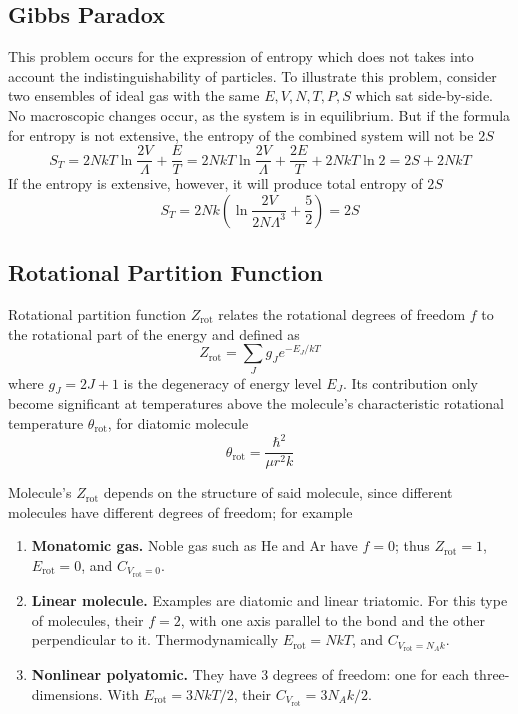 \documentclass[../../../Main.tex]{subfiles}
\begin{document}
\subsection*{Gibbs Paradox}

This problem occurs for the expression of entropy which does not takes into account the indistinguishability of particles. To illustrate this problem, consider two ensembles of ideal gas with the same $E,V,N,T,P,S$ which sat side-by-side.  No macroscopic changes occur, as the system is in equilibrium. But if the formula for entropy is not extensive, the entropy of the combined system will not be $2S$
\begin{equation*}
    S_T=2NkT\ln\frac{2V}{\Lambda}+\frac{E}{T}=2NkT\ln\frac{2V}{\Lambda}+\frac{2E}{T}+2NkT\ln2=2S+2NkT
\end{equation*}
If the entropy is extensive, however, it will produce total entropy of $2S$
\begin{equation*}
    S_T=2Nk\left(\ln\frac{2V}{2N\Lambda^3}+\frac{5}{2}\right)=2S
\end{equation*}

\subsection*{Rotational Partition Function}

Rotational partition function $Z_\text{rot}$ relates the rotational degrees of freedom $f$ to the rotational part of the energy and defined as 
\begin{equation*}
    Z_\text{rot}=\sum_{J} g_Je^{-E_J/kT}
\end{equation*}
where $g_J=2J+1$ is the degeneracy of energy level $E_J$. Its contribution only become significant at temperatures above the molecule's characteristic rotational temperature $\theta_\text{rot}$, for diatomic molecule
\begin{equation*}
    \theta_\text{rot}=\frac{\hbar^2}{\mu r^2 k}
\end{equation*}

Molecule's $Z_\text{rot}$ depends on the structure of said molecule, since different molecules have different degrees of freedom; for example 
\begin{enumerate}
    \item \textbf{Monatomic gas.} Noble gas such as He and Ar have $f=0$; thus $Z_\text{rot}=1$, $E_\text{rot}=0$, and $C_{V_\text{rot}=0}$.
    \item \textbf{Linear molecule.} Examples are diatomic and linear triatomic. For this type of molecules, their $f=2$, with one axis parallel to the bond and the other perpendicular to it. Thermodynamically $E_\text{rot}=NkT$, and $C_{V_\text{rot}=N_Ak}$.
    \item \textbf{Nonlinear polyatomic.} They have 3 degrees of freedom: one for each three-dimensions. With $E_\text{rot}=3NkT/2$, their $C_{V_\text{rot}}=3N_Ak/2$.
\end{enumerate}
\end{document}

